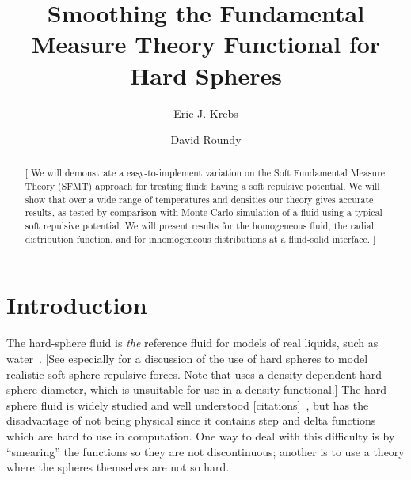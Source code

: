 \documentclass[letterpaper,twocolumn,amsmath,amssymb,prb]{revtex4-1}
\newcommand{\red}[1]{{\color{red} #1}}
\newcommand{\fixme}[1]{\red{[#1]}}
\begin{document}
\title{Smoothing the Fundamental Measure Theory Functional for Hard Spheres}

\author{Eric J. Krebs}

\author{David Roundy}

\begin{abstract}
\fixme{ We will demonstrate a easy-to-implement variation on the Soft
  Fundamental Measure Theory (SFMT) approach for treating fluids
  having a soft repulsive potential.  We will show that over a wide
  range of temperatures and densities our theory gives accurate
  results, as tested by comparison with Monte Carlo simulation of a
  fluid using a typical soft repulsive potential.  We will present
  results for the homogeneous fluid, the radial distribution function,
  and for inhomogeneous distributions at a fluid-solid interface. }
\end{abstract}

\maketitle

\section{Introduction}

The hard-sphere fluid is \emph{the} reference fluid for models of real
liquids, such as water~\cite{gil-villegas-1997-SAFT-VR,
  clark2006developing, andersen1971relationship,
  andersen1972optimized, kalos1974helium, chapman1990new,
  barker1967perturbation}.  \fixme{See especially
  \cite{andersen1971relationship} for a discussion of the use of hard
  spheres to model realistic soft-sphere repulsive forces.  Note that
  \cite{andersen1971relationship} uses a density-dependent hard-sphere
  diameter, which is unsuitable for use in a density functional.} The
hard sphere fluid is widely studied and well understood
\fixme{citations}~\cite{mansoori1971equilibrium, roth2002whitebear,
  rosenfeld1989, rosenfeld1997}, but has the disadvantage of not being
physical since it contains step and delta functions which are hard to
use in computation. One way to deal with this difficulty is by
``smearing'' the functions so they are not discontinuous; another is
to use a theory where the spheres themselves are not so hard.
\end{document}
